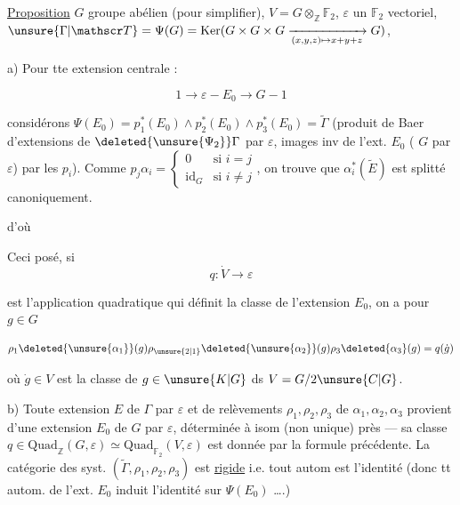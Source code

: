 
\uline{Proposition} $G$ groupe abélien (pour simplifier), $V=G\otimes_{\mathbb Z}\mathbb F_2$, $\varepsilon$ un $\mathbb F_2$ vectoriel, $\unsure{\Gamma|\mathscr T}=\Psi(G)=\operatorname{Ker}(G\times G\times G\xrightarrow[(x,y,z)\mapsto x+y+z]{}G)$,


a) Pour tte extension centrale  :

\[
1\longrightarrow\varepsilon\mathbin{-} E_0\longrightarrow G\mathbin{-}1
\]

considérons $\Psi(E_0)=p_1^*(E_0)\wedge p_2^*(E_0)\wedge p_3^*(E_0)=\widetilde\Gamma$ (produit de Baer d'extensions de $\deleted{\unsure{\Psi_2}}\Gamma$ par $\varepsilon$, images inv de l'ext. $E_0$ ( $G$ par $\varepsilon$) par les $p_i$). Comme $p_j\alpha_i=\left\{\begin{array}{ll}0&\text{si }i=j\\ \mathrm{id}_G&\text{si }i\ne j\end{array}\right.$, on trouve que $\alpha_i^*(\widetilde E)$ est splitté canoniquement.

d'où


Ceci posé, si
\[
q:\dot V\longrightarrow\varepsilon
\]

est l'application quadratique qui définit la classe de l'extension $E_0$, on a pour $g\in G$

\[
\rho_1\deleted{\unsure{\alpha_1}}(g)\rho_{\unsure{2|1}}\deleted{\unsure{\alpha_2}}(g)\rho_3\deleted{\alpha_3}(g)=q(\dot g)
\]

où $\dot g\in V$ est la classe de $g\in\unsure{K|G}$ ds $V=G/2\unsure{C|G}$.

b) Toute  extension  $E$ de $\Gamma$ par $\varepsilon$ et de relèvements $\rho_1,\rho_2,\rho_3$ de $\alpha_1,\alpha_2,\alpha_3$ provient d'une extension $E_0$ de $G$ par $\varepsilon$, déterminée à isom (non unique) près --- sa classe $q\in\mathrm{Quad}_{\mathbb Z}(G,\varepsilon)\simeq\mathrm{Quad}_{\mathbb F_2}(V,\varepsilon)$ est donnée par la formule précédente. La catégorie  des  syst. $(\widetilde\Gamma,\rho_1,\rho_2,\rho_3)$ est \uline{rigide} i.e. tout autom est l'identité (donc tt autom. de l'ext. $E_0$ induit l'identité sur  $\Psi(E_0)$ \dots.)
